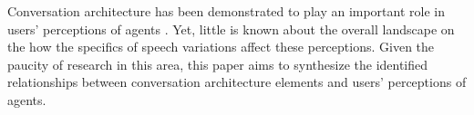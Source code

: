 Conversation architecture has been demonstrated to play an important role in users' perceptions of agents \cite{knijnenburg2016inferring}\cite{moussawi2021perceptions}\cite{seeger2021chatbots}\cmt{[35]}. Yet, little is known about the overall landscape on the how the specifics of speech variations affect these perceptions. Given the paucity of research in this area, this paper aims to synthesize the identified relationships between conversation architecture elements and users' perceptions of agents.


